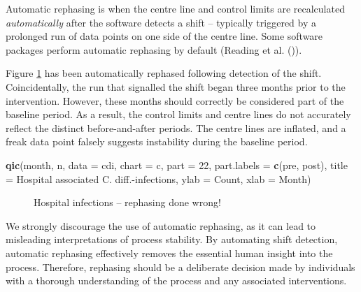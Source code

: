 \documentclass[
]{book}
\makeatletter
\newenvironment{Shaded}{\begin{snugshade}}{\end{snugshade}}
\newcommand{\AttributeTok}[1]{\textcolor[rgb]{0.13,0.29,0.53}{#1}}
\newcommand{\DecValTok}[1]{\textcolor[rgb]{0.00,0.00,0.81}{#1}}
\newcommand{\FunctionTok}[1]{\textcolor[rgb]{0.13,0.29,0.53}{\textbf{#1}}}
\newcommand{\NormalTok}[1]{#1}
\newcommand{\StringTok}[1]{\textcolor[rgb]{0.31,0.60,0.02}{#1}}
\newcommand*\pandocbounded[1]{%
  \sbox\pandoc@box{#1}%
  \Gscale@div\@tempa{\textheight}{\dimexpr\ht\pandoc@box+\dp\pandoc@box\relax}%
  \Gscale@div\@tempb{\linewidth}{\wd\pandoc@box}%
  \ifdim\@tempb\p@<\@tempa\p@\let\@tempa\@tempb\fi%
  \ifdim\@tempa\p@<\p@\scalebox{\@tempa}{\usebox\pandoc@box}%
  \else\usebox{\pandoc@box}%
  \fi%
}
\makeatother
\begin{document}
Automatic rephasing is when the centre line and control limits are recalculated \emph{automatically} after the software detects a shift -- typically triggered by a prolonged run of data points on one side of the centre line. Some software packages perform automatic rephasing by default (Reading et al. ()).

Figure \ref{fig:pitfalls-fig3} has been automatically rephased following detection of the shift. Coincidentally, the run that signalled the shift began three months prior to the intervention. However, these months should correctly be considered part of the baseline period. As a result, the control limits and centre lines do not accurately reflect the distinct before-and-after periods. The centre lines are inflated, and a freak data point falsely suggests instability during the baseline period.

\begin{Shaded}
\begin{Highlighting}[]
\FunctionTok{qic}\NormalTok{(month, n,}
    \AttributeTok{data        =}\NormalTok{ cdi,}
    \AttributeTok{chart       =} \StringTok{\textquotesingle{}c\textquotesingle{}}\NormalTok{,}
    \AttributeTok{part        =} \DecValTok{22}\NormalTok{,}
    \AttributeTok{part.labels =} \FunctionTok{c}\NormalTok{(}\StringTok{\textquotesingle{}pre\textquotesingle{}}\NormalTok{, }\StringTok{\textquotesingle{}post\textquotesingle{}}\NormalTok{),}
    \AttributeTok{title       =} \StringTok{\textquotesingle{}Hospital associated C. diff.{-}infections\textquotesingle{}}\NormalTok{,}
    \AttributeTok{ylab        =} \StringTok{\textquotesingle{}Count\textquotesingle{}}\NormalTok{,}
    \AttributeTok{xlab        =} \StringTok{\textquotesingle{}Month\textquotesingle{}}\NormalTok{)}
\end{Highlighting}
\end{Shaded}

\begin{figure}
\centering
\pandocbounded{}
\caption{\label{fig:pitfalls-fig3}Hospital infections -- rephasing done wrong!}
\end{figure}

We strongly discourage the use of automatic rephasing, as it can lead to misleading interpretations of process stability. By automating shift detection, automatic rephasing effectively removes the essential human insight into the process. Therefore, rephasing should be a deliberate decision made by individuals with a thorough understanding of the process and any associated interventions.
\end{document}
